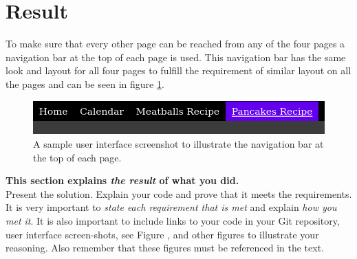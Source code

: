 \documentclass[a4paper]{scrartcl}
\begin{document}


\section{Result}

To make sure that every other page can be reached from any of the four pages a navigation bar at the top of each page is used. This navigation bar has the same look and layout for all four pages to fulfill the requirement of similar layout on all the pages and can be seen in figure \ref{fig:navbar}.

\begin{figure}[h!]
    \begin{center}
        \includegraphics[scale=0.3]{images/navbar.png}
        \caption{A sample user interface screenshot to illustrate the navigation bar at the top of each page.}
        \label{fig:navbar}
    \end{center}
\end{figure}

\textbf{This section explains \textit{the result} of what you did.} \\

\noindent Present the solution. Explain your code and prove that it meets the requirements. It is very important to \textit{state each requirement that is met} and explain \textit{how you met it}. It is also important to include links to your code in your Git repository, user interface screen-shots, see Figure \citet{fig:ui}, and other figures to illustrate your reasoning. Also remember that these figures must be referenced in the text.

\end{document}
